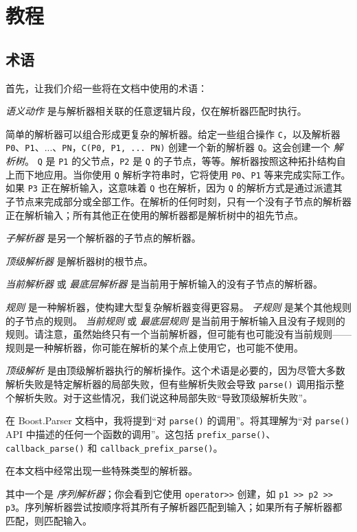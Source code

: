 \chapter{教程}
\section{术语}

首先，让我们介绍一些将在文档中使用的术语：

\emph{语义动作} 是与解析器相关联的任意逻辑片段，仅在解析器匹配时执行。

简单的解析器可以组合形成更复杂的解析器。给定一些组合操作 \texttt{C}，以及解析器 \texttt{P0}、\texttt{P1}、...、\texttt{PN}，\texttt{C(P0, P1, ... PN)} 创建一个新的解析器 \texttt{Q}。这会创建一个 \emph{解析树}。 \texttt{Q} 是 \texttt{P1} 的父节点，\texttt{P2} 是 \texttt{Q} 的子节点，等等。解析器按照这种拓扑结构自上而下地应用。当你使用 \texttt{Q} 解析字符串时，它将使用 \texttt{P0}、\texttt{P1} 等来完成实际工作。如果 \texttt{P3} 正在解析输入，这意味着 \texttt{Q} 也在解析，因为 \texttt{Q} 的解析方式是通过派遣其子节点来完成部分或全部工作。在解析的任何时刻，只有一个没有子节点的解析器正在解析输入；所有其他正在使用的解析器都是解析树中的祖先节点。

\emph{子解析器} 是另一个解析器的子节点的解析器。

\emph{顶级解析器} 是解析器树的根节点。

\emph{当前解析器} 或 \emph{最底层解析器} 是当前用于解析输入的没有子节点的解析器。

\emph{规则} 是一种解析器，使构建大型复杂解析器变得更容易。 \emph{子规则} 是某个其他规则的子节点的规则。 \emph{当前规则} 或 \emph{最底层规则} 是当前用于解析输入且没有子规则的规则。请注意，虽然始终只有一个当前解析器，但可能有也可能没有当前规则——规则是一种解析器，你可能在解析的某个点上使用它，也可能不使用。

\emph{顶级解析} 是由顶级解析器执行的解析操作。这个术语是必要的，因为尽管大多数解析失败是特定解析器的局部失败，但有些解析失败会导致 \texttt{parse()} 调用指示整个解析失败。对于这些情况，我们说这种局部失败“导致顶级解析失败”。

在 Boost.Parser 文档中，我将提到“对 \texttt{parse()} 的调用”。将其理解为“对 \texttt{parse()} API 中描述的任何一个函数的调用”。这包括 \texttt{prefix\_parse()}、\texttt{callback\_parse()} 和 \texttt{callback\_prefix\_parse()}。

在本文档中经常出现一些特殊类型的解析器。

其中一个是 \emph{序列解析器}；你会看到它使用 \texttt{operator>>} 创建，如 \texttt{p1 >> p2 >> p3}。序列解析器尝试按顺序将其所有子解析器匹配到输入；如果所有子解析器都匹配，则匹配输入。

